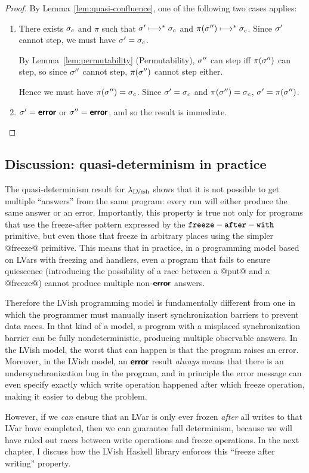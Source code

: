 \ThmQuasiDeterminism
\begin{proof}
  By Lemma~\ref{lem:quasi-confluence}, one of the following two cases
  applies:
  \begin{enumerate}
    \item There exists $\sigma_c$ and $\pi$ such that $\sigma'
      \longmapsto^* \sigma_c$ and $\pi(\sigma'') \longmapsto^* \sigma_c$.
      Since $\sigma'$ cannot step, we must have $\sigma' = \sigma_c$.

      By Lemma~\ref{lem:permutability} (Permutability), $\sigma''$ can
      step iff $\pi(\sigma'')$ can step, so since $\sigma''$ cannot
      step, $\pi(\sigma'')$ cannot step either.

      Hence we must have $\pi(\sigma'') = \sigma_c$.  Since $\sigma' =
      \sigma_c$ and $\pi(\sigma'') = \sigma_c$, $\sigma' = \pi(\sigma'')$.
    \item $\sigma' = \textbf{\textsf{error}}$ or $\sigma'' = \textbf{\textsf{error}}$, and so the result
      is immediate.
  \end{enumerate}
\end{proof}

\subsection{Discussion: quasi-determinism in practice}


The quasi-determinism result for $\lambda_{\textrm{LVish}}$ shows that it is not
possible to get multiple ``answers'' from the same program: every run
will either produce the same answer or an error.  Importantly, this
property is true not only for programs that use the freeze-after
pattern expressed by the ${\mbox{\texttt{freeze}}-\mbox{\texttt{after}}-\mbox{\texttt{with}}}$ primitive, but even those that freeze
in arbitrary places using the simpler @freeze@ primitive.  This means
that in practice, in a programming model based on LVars with freezing
and handlers, even a program that fails to ensure quiescence
(introducing the possibility of a race between a @put@ and a
@freeze@) cannot produce multiple non-$\textbf{\textsf{error}}$ answers.

Therefore the LVish programming model is fundamentally different from
one in which the programmer must manually insert synchronization
barriers to prevent data races.  In that kind of a model, a program
with a misplaced synchronization barrier can be fully
nondeterministic, producing multiple observable answers.  In the LVish
model, the worst that can happen is that the program raises an error.
Moreover, in the LVish model, an $\textbf{\textsf{error}}$ result \emph{always} means
that there is an undersynchronization bug in the program, and in
principle the error message can even specify exactly which write
operation happened after which freeze operation, making it easier to
debug the problem.

However, if we \emph{can} ensure that an LVar is only ever frozen
\emph{after} all writes to that LVar have completed, then we can
guarantee full determinism, because we will have ruled out races
between write operations and freeze operations.  In the next chapter,
I discuss how the LVish Haskell library enforces this ``freeze after
writing'' property.
